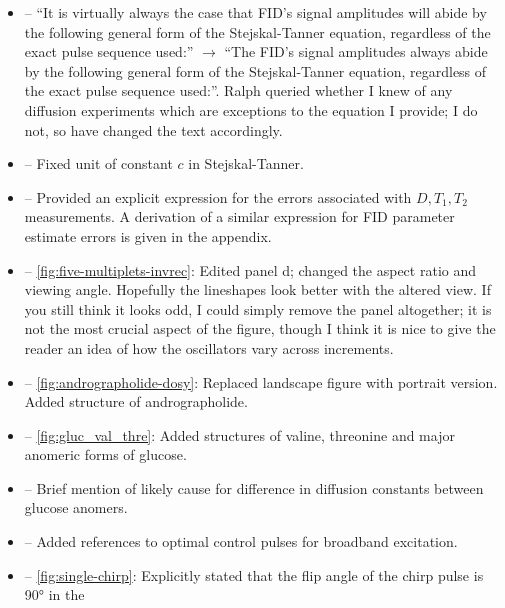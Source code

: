 \documentclass[12pt]{article}
\begin{document}
\begin{itemize}
       \item {} -- ``It is virtually always the case
           that FID’s signal amplitudes will abide by the following general
           form of the Stejskal-Tanner equation, regardless of the exact pulse
           sequence used:'' $\rightarrow$
            ``The FID's signal amplitudes always abide by the following general form
            of the Stejskal-Tanner equation, regardless of the exact pulse sequence
            used:''.
            Ralph queried whether I knew of any diffusion experiments which are
            exceptions to the equation I provide; I do not, so have changed the
            text accordingly.
        \item {} -- Fixed unit of constant $c$ in
            Stejskal-Tanner.
        \item {} -- Provided an explicit expression for
            the errors associated with $D, T_1, T_2$ measurements.
            A derivation of a similar expression for FID parameter estimate
            errors is given in the appendix.
        \item {} -- \cref{fig:five-multiplets-invrec}:
            Edited panel d; changed the aspect ratio and viewing angle.
            Hopefully the lineshapes look better with the altered view. If you
            still think it looks odd, I could simply remove the panel
            altogether; it is not the most crucial aspect of the figure, though
            I think it is nice to give the reader an idea of how the
            oscillators vary across increments.
        \item {} -- \cref{fig:andrographolide-dosy}:
            Replaced landscape figure with portrait version. Added structure of
            andrographolide.
        \item {} -- \cref{fig:gluc_val_thre}: Added
            structures of valine, threonine and major anomeric forms of glucose.
        \item {} -- Brief mention of likely cause for
            difference in diffusion constants between glucose anomers.
        \item {} -- Added references to optimal
            control pulses for broadband excitation.
        \item {} -- \cref{fig:single-chirp}: Explicitly
            stated that the flip angle of the chirp pulse is \ang{90} in the

\end{itemize}
\end{document}
